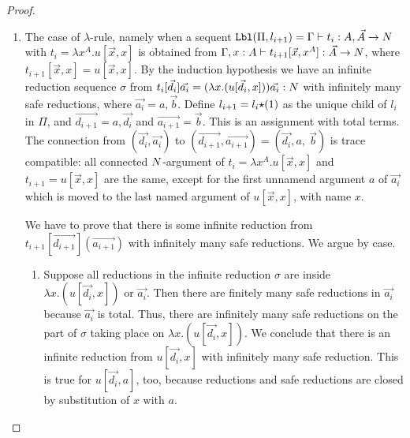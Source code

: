 \begin{proof}
\begin{enumerate}
\item
  The case of $\lambda$-rule, namely when a sequent
  ${\tt Lbl}(\Pi,l_{i+1}) = 
    \Gamma\vdash t_i : A, \vec{A} \rightarrow {N}$ with $t_i = \lambda x^A.u[\vec{x},x]$
  is obtained from
  $\Gamma,x:A\vdash t_{i+1}[\vec{x},x^A]:\vec{A}\rightarrow{N}$, 
  where $t_{i+1}[\vec{x},x]=u[\vec{x},x]$.
  By the induction hypothesis we have an infinite reduction sequence $\sigma$ from
  $t_i[\vec{d_i}]\vec{a_i} = (\lambda x.(u[\vec{d_i},x]))\vec{a_i}:{N}$ with infinitely many safe
  reductions,
  where $\vec{a_i} = a,\vec{b}$. 
  Define $l_{i+1}=l_i{\star}(1)$ as the unique child of $l_i$ in $\Pi$,
  and $\vec{d_{i+1}} = a,\vec{d_i}$  and $\vec{a_{i+1}} = \vec{b}$. 
  This is an assignment with total terms.
    The connection from 
  $(\vec{d_i},\vec{a_i})$ to $(\vec{d_{i+1}},\vec{a_{i+1}}) = (\vec{d_i},a, \ \vec{b})$ is
  trace compatible: all connected ${N}$-argument of 
  $t_{i}=\lambda x^A.u[\vec{x},x]$ and $t_{i+1}=u[\vec{x},x]$ are 
  the same, except for the first unnamend argument $a$ of $\vec{a_i}$ which is moved to
  the last named argument of $u[\vec{x},x]$, with name $x$.
  
  We have to prove that there is some infinite reduction from 
  $t_{i+1}[\vec{d_{i+1}}](\vec{a_{i+1}})$ with infinitely
  many safe reductions. We argue by case.

\begin{enumerate}
\item
 Suppose all reductions in the infinite reduction $\sigma$ 
  are inside $\lambda x.(u[\vec{d_i},x])$ or $\vec{a_i}$.
 Then there are finitely many safe reductions in $\vec{a_i}$ because $\vec{a_i}$ is total.
 Thus, there are infinitely many safe reductions on the part of $\sigma$
  taking place on $\lambda x.(u[\vec{d_i},x])$.
  We conclude that there is an infinite reduction from $u[\vec{d_i},x]$ with infinitely many safe reduction.
  This is true for $u[\vec{d_i},a]$, too, because reductions and safe reductions are closed by substitution
  of $x$ with $a$.


\end{enumerate}
\end{enumerate}
\end{proof}
